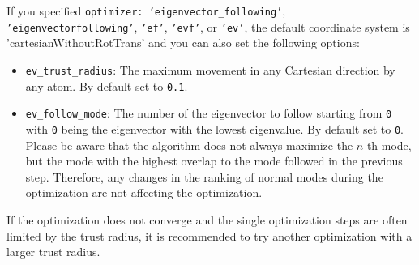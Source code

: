 \documentclass[]{tufte-book}
\begin{document}
If you specified \texttt{optimizer: 'eigenvector\_following'}, \texttt{'eigenvectorfollowing'}, \texttt{'ef'}, \texttt{'evf'}, or \texttt{'ev'},
the default coordinate system is 'cartesianWithoutRotTrans'
and you can also set the following options:
\begin{itemize}
\item \texttt{ev\_trust\_radius}: The maximum movement in any Cartesian direction by any atom. By default set to \texttt{0.1}.
\item \texttt{ev\_follow\_mode}: The number of the eigenvector to follow starting from \texttt{0} with \texttt{0} being the eigenvector with the lowest eigenvalue. By default set to \texttt{0}. Please be aware that the algorithm does not always maximize the $n$-th mode, but the mode with the highest overlap to the mode followed in the previous step. Therefore, any changes in the ranking of normal modes during the optimization are not affecting the optimization.
\end{itemize}
If the optimization does not converge and the single optimization steps are often limited by the trust radius, it is recommended to try another optimization with a larger trust radius.
\end{document}
